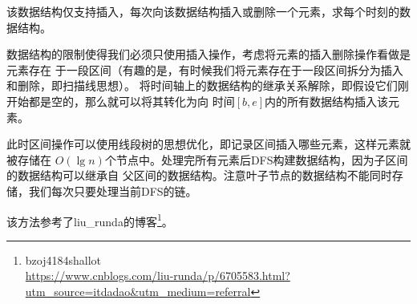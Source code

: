 该数据结构仅支持插入，每次向该数据结构插入或删除一个元素，求每个时刻的数据结构。

数据结构的限制使得我们必须只使用插入操作，考虑将元素的插入删除操作看做是元素存在
于一段区间（有趣的是，有时候我们将元素存在于一段区间拆分为插入和删除，即扫描线思想）。
将时间轴上的数据结构的继承关系解除，即假设它们刚开始都是空的，那么就可以将其转化为向
时间$[b,e]$内的所有数据结构插入该元素。

此时区间操作可以使用线段树的思想优化，即记录区间插入哪些元素，这样元素就被存储在
$O(\lg n)$个节点中。处理完所有元素后DFS构建数据结构，因为子区间的数据结构可以继承自
父区间的数据结构。注意叶子节点的数据结构不能同时存储，我们每次只要处理当前DFS的链。

该方法参考了liu\_runda的博客\footnote{
    bzoj4184shallot\\
    \url{https://www.cnblogs.com/liu-runda/p/6705583.html?utm\_source=itdadao&utm\_medium=referral}
}。
